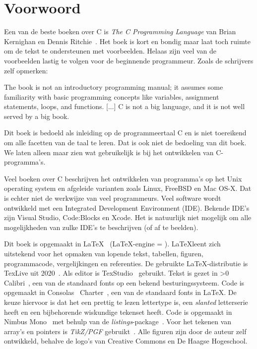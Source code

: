 

\chapter{Voorwoord}
\label{cha:voorwoord}
\thispagestyle{empty}

 Een van de beste boeken over C is
\textsl{The C Programming Language} van Brian Kernighan en Dennis
Ritchie~\cite{kernighan1988c}. Het boek is kort en bondig maar laat toch
ruimte om de tekst te ondersteunen met voorbeelden. Helaas zijn veel van
de voorbeelden lastig te volgen voor de beginnende programmeur. Zoals de
schrijvers zelf opmerken:

\begin{displayquote}
The book is not an introductory programming manual; it assumes some familiarity
with basic programming concepts like variables, assignment statements,
loops, and functions.
[...]
C is not a big language, and it is not well served by a big book.
\end{displayquote}

Dit boek is bedoeld als inleiding op de programmeertaal C en is niet
toereikend om alle facetten van de taal te leren. Dat is ook niet de
bedoeling van dit boek. We laten alleen maar zien wat gebruikelijk is bij
het ontwikkelen van C-programma's. 

Veel boeken over C beschrijven het ontwikkelen van programma's op het Unix
operating system en afgeleide varianten zoals Linux, FreeBSD en Mac OS-X.
Dat is echter niet de werkwijze van veel programmeurs. Veel software wordt
ontwikkeld met een Integrated Development Environment (IDE). Bekende IDE's
zijn Visual Studio, Code:Blocks en Xcode. Het is natuurlijk niet mogelijk
om alle mogelijkheden van zulke IDE's te beschrijven (of af te beelden).

Dit boek is opgemaakt in \LaTeX~\cite{latexwebsite} (\LaTeX-engine = \booktexbanner).
\LaTeX\@ leent zich uitstekend
voor het opmaken van lopende tekst, tabellen, figuren, programmacode, vergelijkingen
en referenties. De gebruikte \LaTeX-distributie is TexLive uit 2020~\cite{texlivewebsite}.
Als editor is TexStudio~\cite{texstudiowebsite} gebruikt. Tekst is gezet in
\fi{}\fi>0
Calibri~\cite{calibrifont}, een van de standaard fonts op een bekend besturingssysteem.
Code is opgemaakt in Consolas~\cite{consolasfont}
\else
Charter~\cite{charterfont}, een van de standaard fonts in \LaTeX.
De keuze hiervoor is dat het een prettig te lezen lettertype is, een
\textsl{slanted} letterserie heeft en een bijbehorende wiskundige tekenset heeft.
Code is opgemaakt in Nimbus Mono~\cite{nimbusfont}
\fi
met behulp van de \textsl{listings}-package~\cite{listingsctan}.
Voor het
tekenen van array's en pointers is \textsl{TikZ/PGF} gebruikt~\cite{tikzctan}.
Alle figuren zijn door de auteur zelf ontwikkeld, behalve de logo's van Creative
Commons en De Haagse Hogeschool.

